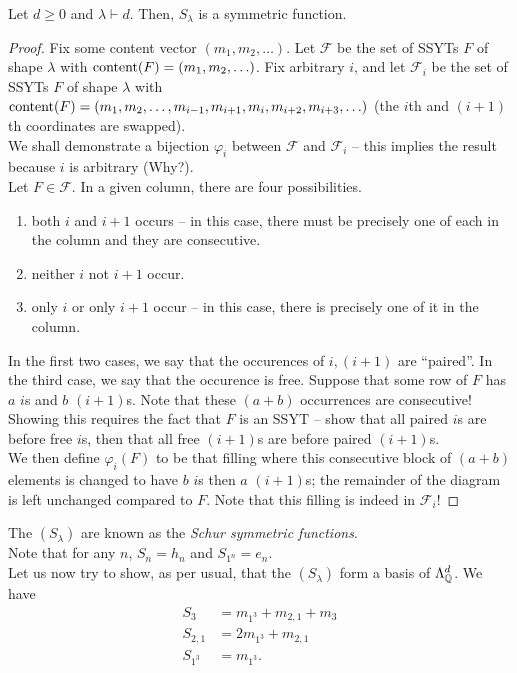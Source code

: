 	\begin{ftheo}
		Let $d \ge 0$ and $\lambda \vdash d$. Then, $S_\lambda$ is a symmetric function.
	\end{ftheo}
	\begin{proof}
		Fix some content vector $(m_1,m_2,\ldots)$. Let $\mathcal{F}$ be the set of SSYTs $F$ of shape $\lambda$ with $\operatorname{content}(F) = (m_1,m_2,\ldots)$. Fix arbitrary $i$, and let $\mathcal{F}_i$ be the set of SSYTs $F$ of shape $\lambda$ with $\operatorname{content}(F) = (m_1,m_2,\ldots,m_{i-1},m_{i+1},m_i,m_{i+2},m_{i+3},\ldots)$ (the $i$th and $(i+1)$th coordinates are swapped).\\
		We shall demonstrate a bijection $\varphi_i$ between $\mathcal{F}$ and $\mathcal{F}_i$ -- this implies the result because $i$ is arbitrary (Why?).\\
		Let $F \in \mathcal{F}$. In a given column, there are four possibilities.
		\begin{enumerate}
			\item both $i$ and $i+1$ occurs -- in this case, there must be precisely one of each in the column and they are consecutive.
			\item neither $i$ not $i+1$ occur.
			\item only $i$ or only $i+1$ occur -- in this case, there is precisely one of it in the column.
		\end{enumerate}
		In the first two cases, we say that the occurences of $i,(i+1)$ are ``paired''. In the third case, we say that the occurence is free. Suppose that some row of $F$ has $a$ $i$s and $b$ $(i+1)$s. Note that these $(a+b)$ occurrences are consecutive! Showing this requires the fact that $F$ is an SSYT -- show that all paired $i$s are before free $i$s, then that all free $(i+1)$s are before paired $(i+1)$s.\\
		We then define $\varphi_i(F)$ to be that filling where this consecutive block of $(a+b)$ elements is changed to have $b$ $i$s then $a$ $(i+1)$s; the remainder of the diagram is left unchanged compared to $F$. Note that this filling is indeed in $\mathcal{F}_i$! %
	\end{proof}

	The $(S_\lambda)$ are known as the \emph{Schur symmetric functions}.\\
	Note that for any $n$, $S_n = h_n$ and $S_{1^n} = e_n$.\\
	Let us now try to show, as per usual, that the $(S_\lambda)$ form a basis of $\Lambda_{\mathbb{Q}}^d$. We have
	\begin{align*}
		S_3 &= m_{1^3} + m_{2,1} + m_3 \\
		S_{2,1} &= 2m_{1^3} + m_{2,1} \\
		S_{1^3} &= m_{1^3}.
	\end{align*}

